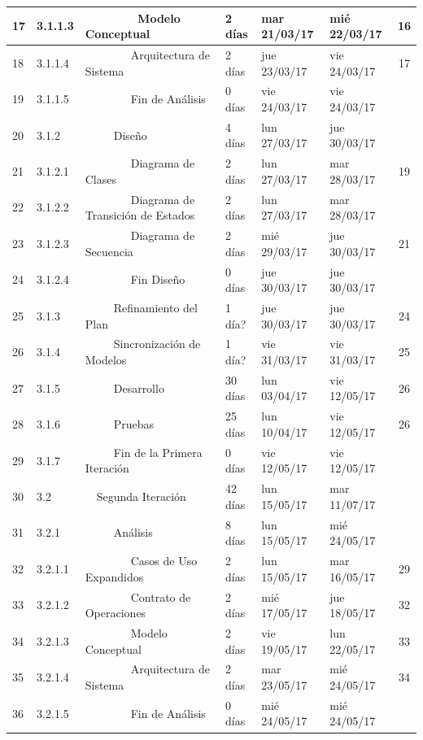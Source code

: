 \begin{center}
\begin{longtable}{  l  l  l  l  l  l  c  }
	17 & 3.1.1.3 &         Modelo Conceptual & 2 días & mar 21/03/17 & mié 22/03/17 & 16 \\ \hline
	18 & 3.1.1.4 &         Arquitectura de Sistema & 2 días & jue 23/03/17 & vie 24/03/17 & 17 \\ \hline
	19 & 3.1.1.5 &         Fin de Análisis & 0 días & vie 24/03/17 & vie 24/03/17 &  \\ \hline
	20 & 3.1.2 &      Diseño & 4 días & lun 27/03/17 & jue 30/03/17 &  \\ \hline
	21 & 3.1.2.1 &         Diagrama de Clases & 2 días & lun 27/03/17 & mar 28/03/17 & 19 \\ \hline
	22 & 3.1.2.2 &         Diagrama de Transición de Estados & 2 días & lun 27/03/17 & mar 28/03/17 &  \\ \hline
	23 & 3.1.2.3 &         Diagrama de Secuencia & 2 días & mié 29/03/17 & jue 30/03/17 & 21 \\ \hline
	24 & 3.1.2.4 &         Fin Diseño & 0 días & jue 30/03/17 & jue 30/03/17 &  \\ \hline
	25 & 3.1.3 &      Refinamiento del Plan & 1 día? & jue 30/03/17 & jue 30/03/17 & 24 \\ \hline
	26 & 3.1.4 &      Sincronización de Modelos & 1 día? & vie 31/03/17 & vie 31/03/17 & 25 \\ \hline
	27 & 3.1.5 &      Desarrollo & 30 días & lun 03/04/17 & vie 12/05/17 & 26 \\ \hline
	28 & 3.1.6 &      Pruebas & 25 días & lun 10/04/17 & vie 12/05/17 & 26 \\ \hline
	29 & 3.1.7 &      Fin de la Primera Iteración & 0 días & vie 12/05/17 & vie 12/05/17 &  \\ \hline
	30 & 3.2 &   Segunda Iteración & 42 días & lun 15/05/17 & mar 11/07/17 &  \\ \hline
	31 & 3.2.1 &      Análisis & 8 días & lun 15/05/17 & mié 24/05/17 &  \\ \hline
	32 & 3.2.1.1 &         Casos de Uso Expandidos & 2 días & lun 15/05/17 & mar 16/05/17 & 29 \\ \hline
	33 & 3.2.1.2 &         Contrato de Operaciones & 2 días & mié 17/05/17 & jue 18/05/17 & 32 \\ \hline
	34 & 3.2.1.3 &         Modelo Conceptual & 2 días & vie 19/05/17 & lun 22/05/17 & 33 \\ \hline
	35 & 3.2.1.4 &         Arquitectura de Sistema & 2 días & mar 23/05/17 & mié 24/05/17 & 34 \\ \hline
	36 & 3.2.1.5 &         Fin de Análisis & 0 días & mié 24/05/17 & mié 24/05/17 &  \\ \hline

\end{longtable}
\end{center}
